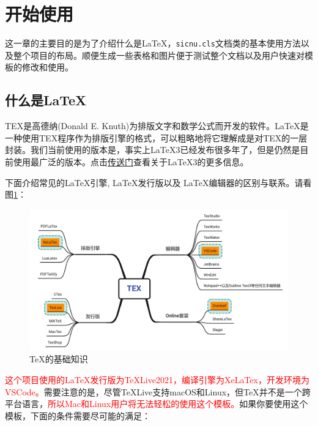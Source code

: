\section{开始使用}\label{sec:intro}

\par 这一章的主要目的是为了介绍什么是\LaTeX，\verb|sicnu.cls|文档类的基本使用方法以及整个项目的布局。顺便生成一些表格和图片便于测试整个文档以及用户快速对模板的修改和使用。

\subsection{什么是\LaTeX }\label{sec:intro:p1}
\par TEX是高德纳(Donald E. Knuth)为排版文字和数学公式而开发的软件\cite{texbook}。\LaTeX 是一种使用TEX程序作为排版引擎的格式，可以粗略地将它理解成是对TEX的一层封装。我们当前使用的版本是\LaTeXe，事实上{\LaTeX}3已经发布很多年了，但是\LaTeXe 仍然是目前使用最广泛的版本。点击\href{https://www.latex-project.org/latex3/}{传送门}查看关于{\LaTeX}3的更多信息。

\par 下面介绍常见的\LaTeX 引擎, \LaTeX 发行版以及 \LaTeX 编辑器的区别与联系。请看图\ref{fig:texbase}：
\begin{figure}[H]
    \centering
    \includegraphics[scale=0.5]{./img/TEX.pdf}
    \caption{TeX的基础知识}
    \label{fig:texbase}
\end{figure}

\par \textcolor{red}{这个项目使用的\LaTeX 发行版为TeXLive2021，编译引擎为XeLaTex，开发环境为VSCode。}需要注意的是，尽管TeXLive支持macOS和Linux，但TeX并不是一个跨平台语言，\textcolor{red}{所以Mac和Linux用户将无法轻松的使用这个模板。}如果你要使用这个模板，下面的条件需要尽可能的满足：

